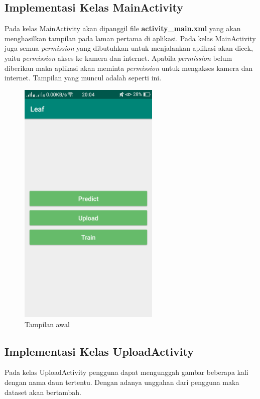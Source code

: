 \subsection{Implementasi Kelas MainActivity}
\par Pada kelas MainActivity akan dipanggil file \textbf{activity\_main.xml} yang akan menghasilkan tampilan pada laman pertama di aplikasi. Pada kelas MainActivity juga semua \textit{permission} yang dibutuhkan untuk menjalankan aplikasi akan dicek, yaitu \textit{permission} akses ke kamera dan internet. Apabila \textit{permission} belum diberikan maka aplikasi akan meminta \textit{permission} untuk mengakses kamera dan internet. Tampilan yang muncul adalah seperti ini.
\begin{figure}[H]
	\centering\includegraphics[width=0.6\textwidth]{bab4/figures/main.png}
	\caption{Tampilan awal}
	\label{fig:main}
\end{figure}

\subsection{Implementasi Kelas UploadActivity}
\par Pada kelas UploadActivity pengguna dapat mengunggah gambar beberapa kali dengan nama daun tertentu. Dengan adanya unggahan dari pengguna maka dataset akan bertambah.


